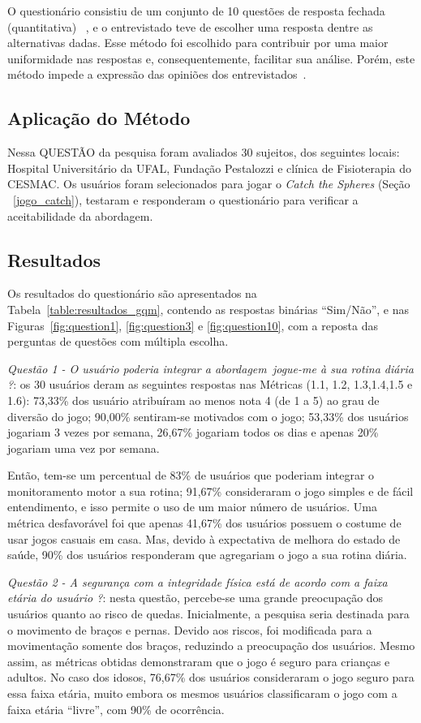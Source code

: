 O questionário consistiu de um conjunto de 10 questões de resposta fechada (quantitativa) ~\cite{elicquest05}, e o entrevistado teve de escolher uma resposta dentre as alternativas dadas. Esse método foi escolhido para contribuir por uma maior uniformidade nas respostas e, consequentemente, facilitar sua análise. Porém, este método impede a expressão das opiniões dos entrevistados~\cite{elicquest05}. 


\subsection{Aplicação do Método}
Nessa QUESTÃO da pesquisa foram avaliados 30 sujeitos, dos seguintes locais: Hospital Universitário da UFAL, Fundação Pestalozzi e clínica de Fisioterapia do CESMAC. Os usuários foram selecionados para jogar o \emph{Catch the Spheres} (Seção ~\ref{jogo_catch}), testaram e responderam o questionário para verificar a aceitabilidade da abordagem. 


\subsection{Resultados}
Os resultados do questionário são apresentados na Tabela~\ref{table:resultados_gqm}, contendo as respostas binárias ``Sim/Não'', e nas Figuras~\ref{fig:question1}, \ref{fig:question3} e \ref{fig:question10}, com a reposta das perguntas de questões com múltipla escolha.

\textit{Questão 1 - O usuário poderia integrar a abordagem~\ac{jogue-me} à sua rotina diária ?}: os 30 usuários deram as seguintes respostas nas Métricas (1.1, 1.2, 1.3,1.4,1.5 e 1.6): 73,33\% dos usuário atribuíram ao menos nota 4 (de 1 a 5) ao grau de diversão do jogo; 90,00\% sentiram-se motivados com o jogo; 53,33\% dos usuários jogariam 3 vezes por semana, 26,67\% jogariam todos os dias e apenas 20\% jogariam uma vez por semana. 

Então, tem-se um percentual de 83\% de usuários que poderiam integrar o monitoramento motor a sua rotina; 91,67\% consideraram o jogo simples e de fácil entendimento, e isso permite o uso de um maior número de usuários. Uma métrica desfavorável foi que apenas 41,67\% dos usuários possuem o costume de usar jogos casuais em casa. Mas, devido à expectativa de melhora do estado de saúde, 90\% dos usuários responderam que agregariam o jogo a sua rotina diária.

\textit{Questão 2 - A segurança com a integridade física está de acordo com a faixa etária do usuário
?}: nesta questão, percebe-se uma grande preocupação dos usuários quanto ao risco de quedas. Inicialmente, a pesquisa seria destinada para o movimento de braços e pernas. Devido aos riscos, foi modificada para a movimentação somente dos braços, reduzindo a preocupação dos usuários. Mesmo assim, as métricas obtidas demonstraram que o jogo é seguro para crianças e adultos. No caso dos idosos, 76,67\% dos usuários consideraram o jogo seguro para essa faixa etária, muito embora os mesmos usuários classificaram o jogo com a faixa etária ``livre'', com 90\% de ocorrência.

